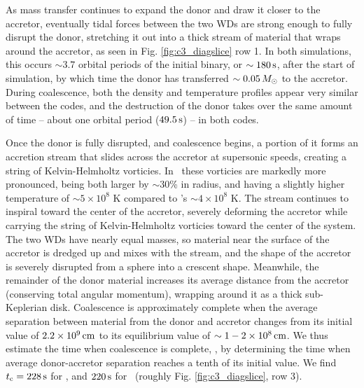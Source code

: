 As mass transfer continues to expand the donor and draw it closer to the accretor, eventually tidal forces between the two WDs are strong enough to fully disrupt the donor, stretching it out into a thick stream of material that wraps around the accretor, as seen in Fig. \ref{fig:c3_diagslice} row 1.  In both simulations, this occurs $\sim3.7$ orbital periods of the initial binary, or $\sim180\,\mathrm{s}$, after the start of simulation, by which time the donor has transferred $\sim0.05\,\Msun$ to the accretor.  During coalescence, both the density and temperature profiles appear very similar between the codes, and the destruction of the donor takes over the same amount of time -- about one orbital period ($49.5\,\mathrm{s}$) -- in both codes.


Once the donor is fully disrupted, and coalescence begins, a portion of it forms an accretion stream that slides across the accretor at supersonic speeds, creating a string of Kelvin-Helmholtz vorticies.  In \arepo\ these vorticies are markedly more pronounced, being both larger by $\sim30$\% in radius, and having a slightly higher temperature of $\sim5\times10^8$ K compared to \gasoline's $\sim4\times10^8$ K.  The stream continues to inspiral toward the center of the accretor, severely deforming the accretor while carrying the string of Kelvin-Helmholtz vorticies toward the center of the system.  The two WDs have nearly equal masses, so material near the surface of the accretor is dredged up and mixes with the stream, and the shape of the accretor is severely disrupted from a sphere into a crescent shape.  Meanwhile, the remainder of the donor material increases its average distance from the accretor (conserving total angular momentum), wrapping around it as a thick sub-Keplerian disk.  Coalescence is approximately complete when the average separation between material from the donor and accretor changes from its initial value of $2.2\times10^9\,\mathrm{cm}$ to its equilibrium value of $\sim1-2\times10^8\,\mathrm{cm}$.  We thus estimate the time when coalescence is complete, \tcoal, by determining the time when average donor-accretor separation reaches a tenth of its initial value.  We find $\tcoal = 228\,\mrm{s}$ for \gasoline, and $220\,\mathrm{s}$ for \arepo\ (roughly Fig. \ref{fig:c3_diagslice}, row 3).


